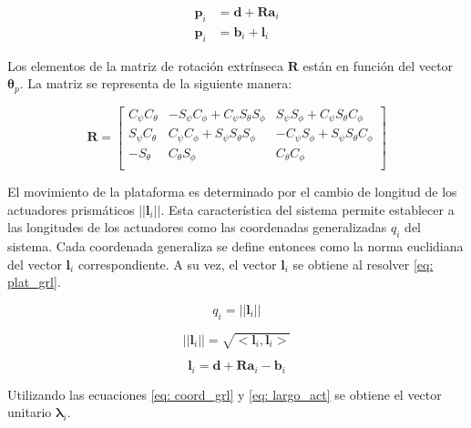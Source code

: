 \begin{subequations} \label{eq: plat_grl}
 \begin{align}
    \mathbf p_i & = \mathbf d + \mathbf R\mathbf a_i \\
    \mathbf p_i & = \mathbf b_i + \mathbf l_i
 \end{align}
\end{subequations}


Los elementos de la matriz de rotación 
extrínseca $\mathbf R$ están en función del vector $\mathbf \theta_p$.
La matriz se representa de la siguiente manera:

\begin{equation} \label{eq: Mrot-P}
\mathbf R = \begin{bmatrix}
C_\psi C_\theta & -S_\psi C_\phi + C_\psi S_\theta S_\phi & S_\psi S_\phi + C_\psi S_\theta C_\phi\\
S_\psi C_\theta & C_\psi C_\phi + S_\psi S_\theta S_\phi & -C_\psi S_\phi + S_\psi S_\theta C_\phi\\
-S_\theta & C_\theta S_\phi & C_\theta C_\phi\\
\end{bmatrix}
\end{equation}

El movimiento de la plataforma es determinado por el cambio de longitud
de los actuadores prismáticos $||\mathbf l_i||$.
Esta característica del sistema permite establecer
a las longitudes de los actuadores como las coordenadas 
generalizadas $q_i$ del sistema.
Cada coordenada generaliza se define entonces como la norma euclidiana
del vector $\mathbf l_i$ correspondiente.
A su vez, el vector $\mathbf l_i$ se obtiene al resolver 
\eqref{eq: plat_grl}.

\begin{equation} \label{eq: coord_grl}
    q_i = ||\mathbf l_i||
\end{equation}

\begin{equation} \label{eq: l}
    ||\mathbf l_i|| = \sqrt{<\mathbf l_i, \mathbf l_i>} 
\end{equation}

\begin{equation} \label{eq: largo_act}
\mathbf l_i = \mathbf d + \mathbf R \mathbf a_i - \mathbf b_i
\end{equation}

Utilizando las ecuaciones \ref{eq: coord_grl} y 
\ref{eq: largo_act} se obtiene el vector unitario 
$\boldsymbol \lambda_i$.

